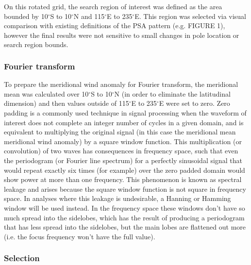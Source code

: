 On this rotated grid, the search region of interest was defined as the area bounded by 10$^{\circ}$S to 10$^{\circ}$N and 115$^{\circ}$E to 235$^{\circ}$E. This region was selected via visual comparison with existing definitions of the PSA pattern (e.g. FIGURE 1), however the final results were not sensitive to small changes in pole location or search region bounds.

\subsubsection{Fourier transform}

To prepare the meridional wind anomaly for Fourier transform, the meridional mean was calculated over 10$^{\circ}$S to 10$^{\circ}$N (in order to eliminate the latitudinal dimension) and then values outside of 115$^{\circ}$E to 235$^{\circ}$E were set to zero. Zero padding is a commonly used technique in signal processing when the waveform of interest does not complete an integer number of cycles in a given domain, and is equivalent to multiplying the original signal (in this case the meridional mean meridional wind anomaly) by a square window function. This multiplication (or convolution) of two waves has consequences in frequency space, such that even the periodogram (or Fourier line spectrum) for a perfectly sinusoidal signal that would repeat exactly six times (for example) over the zero padded domain would show power at more than one frequency. This phenomenon is known as spectral leakage and arises because the square window function is not square in frequency space. In analyses where this leakage is undesirable, a Hanning or Hamming window will be used instead. In the frequency space these windows don't have so much spread into the sidelobes, which has the result of producing a periodogram that has less spread into the sidelobes, but the main lobes are flattened out more (i.e. the focus frequency won't have the full value).

\subsubsection{Selection}

